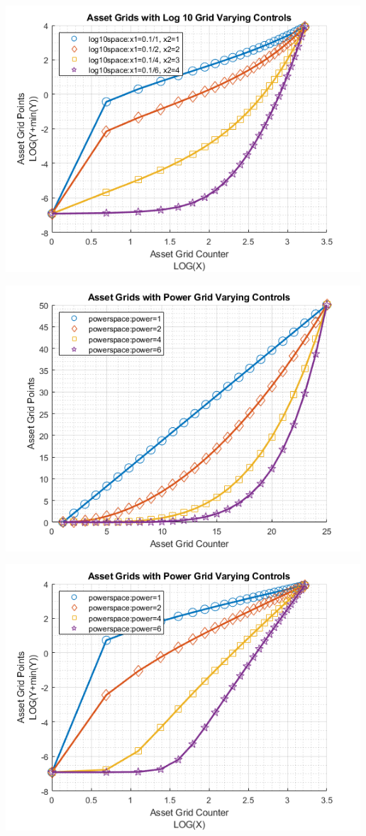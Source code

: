 \documentclass[
]{book}
\begin{document}
\includegraphics[width=5.20833in,height=\textheight]{img/fx_saveborr_grid_images/figure_3.png}

\includegraphics[width=5.20833in,height=\textheight]{img/fx_saveborr_grid_images/figure_4.png}

\includegraphics[width=5.20833in,height=\textheight]{img/fx_saveborr_grid_images/figure_5.png}
\end{document}
